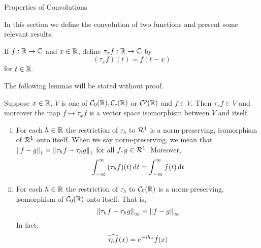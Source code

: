 \begin{section}{Properties of Convolutions}

	In this section we define the convolution of two
	functions and present some relevant results.
	

\begin{defn}
	If $f:\real \rightarrow \cmplx$ and $\isreal$, define
	$\tau_x f:\real \rightarrow \cmplx$ by
		\begin{displaymath}
			(\tau_x f)(t) = f(t-x)
		\end{displaymath}
	for $\isreal[t]$.
\end{defn}

	The following lemmas will be stated without proof.
	
\begin{lemma}
	Suppose $\isreal$, $V$ is one of $\ctszeror, \ctscompact$
	or $\ctsdiff[p](\real)$ and $f \in V$. Then $\tau_x f \in
	V$ and moreover the map $f \mapsto \tau_x f$ is a vector
	space isomorphism between $V$ and itself.
\end{lemma}

\begin{lemma}
	\begin{enumerate}[i)]
	
		\item
			For each $\isreal[h]$ the restriction of $\tau_h$ to $\absint$
			is a norm-preserving, isomorphism of $\absint$ onto itself.
			When we say norm-preserving, we mean that $\norm[1]{f-g} =
			\norm[1]{\tau_h f - \tau_h g}$ for all $f,g \in \absint$.
			Moreover,
				\begin{displaymath}
					\myintb{(\tau_h f)(t)}{t} = \myintb{f(t)}{t}
				\end{displaymath}
		
		\item
			For each $\isreal[h]$ the restriction of $\tau_h$ to $\ctszeror$
			is a norm-preserving, isomorphism of $\ctszeror$ onto itself.
			That is,
				\begin{displaymath}
					\supnorm{\tau_h f - \tau_h g} = \supnorm{f-g}
				\end{displaymath}
			In fact,
				\begin{displaymath}
					\F[\tau_h f](x) = e^{-ihx} \f(x)
				\end{displaymath}
			

\end{enumerate}
\end{lemma}
\end{section}
